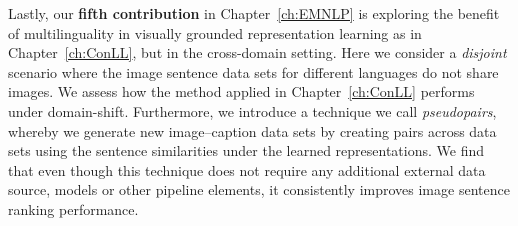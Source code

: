 Lastly, our \textbf{fifth contribution} in Chapter~\ref{ch:EMNLP} is exploring the benefit of multilinguality
in visually grounded representation learning as in Chapter~\ref{ch:ConLL}, but in the cross-domain setting.
Here we consider a \emph{disjoint} scenario where the image sentence data sets for different languages do
not share images. We assess how the method applied in Chapter~\ref{ch:ConLL} performs under
domain-shift. Furthermore, we introduce a technique we call \emph{pseudopairs}, whereby we generate
new image--caption data sets by creating pairs across data sets using the sentence similarities under
the learned representations. We find that even though this technique does not require any additional
external data source, models or other pipeline elements, 
it consistently improves image sentence ranking performance.


